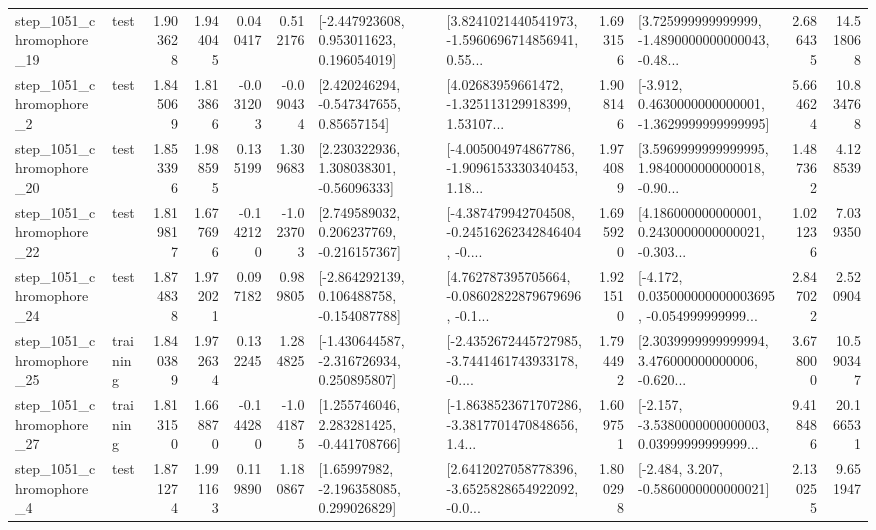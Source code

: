\begin{tabular}{llrrrrllrlrr}
 step\_1051\_chromophore\_19 &      test &      1.903628 &    1.944045 &      0.040417 &  0.512176 &    [-2.447923608, 0.953011623, 0.196054019] &  [3.8241021440541973, -1.5960696714856941, 0.55... &       1.693156 &  [3.725999999999999, -1.4890000000000043, -0.48... &            2.686435 &         14.518068 \\
  step\_1051\_chromophore\_2 &      test &      1.845069 &    1.813866 &     -0.031203 & -0.090434 &     [2.420246294, -0.547347655, 0.85657154] &  [4.02683959661472, -1.325113129918399, 1.53107... &       1.908146 &  [-3.912, 0.4630000000000001, -1.3629999999999995] &            5.664624 &         10.834768 \\
 step\_1051\_chromophore\_20 &      test &      1.853396 &    1.988595 &      0.135199 &  1.309683 &     [2.230322936, 1.308038301, -0.56096333] &  [-4.005004974867786, -1.9096153330340453, 1.18... &       1.974089 &  [3.5969999999999995, 1.9840000000000018, -0.90... &            1.487362 &          4.128539 \\
 step\_1051\_chromophore\_22 &      test &      1.819817 &    1.677696 &     -0.142120 & -1.023703 &    [2.749589032, 0.206237769, -0.216157367] &  [-4.387479942704508, -0.24516262342846404, -0.... &       1.695920 &  [4.186000000000001, 0.2430000000000021, -0.303... &            1.021236 &          7.039350 \\
 step\_1051\_chromophore\_24 &      test &      1.874838 &    1.972021 &      0.097182 &  0.989805 &   [-2.864292139, 0.106488758, -0.154087788] &  [4.762787395705664, -0.08602822879679696, -0.1... &       1.921510 &  [-4.172, 0.035000000000003695, -0.054999999999... &            2.847022 &          2.520904 \\
 step\_1051\_chromophore\_25 &  training &      1.840389 &    1.972634 &      0.132245 &  1.284825 &   [-1.430644587, -2.316726934, 0.250895807] &  [-2.4352672445727985, -3.7441461743933178, -0.... &       1.794492 &  [2.3039999999999994, 3.476000000000006, -0.620... &            3.678000 &         10.590347 \\
 step\_1051\_chromophore\_27 &  training &      1.813150 &    1.668870 &     -0.144280 & -1.041875 &    [1.255746046, 2.283281425, -0.441708766] &  [-1.8638523671707286, -3.3817701470848656, 1.4... &       1.609751 &  [-2.157, -3.5380000000000003, 0.03999999999999... &            9.418486 &         20.166531 \\
  step\_1051\_chromophore\_4 &      test &      1.871274 &    1.991163 &      0.119890 &  1.180867 &     [1.65997982, -2.196358085, 0.299026829] &  [2.6412027058778396, -3.6525828654922092, -0.0... &       1.800298 &               [-2.484, 3.207, -0.5860000000000021] &            2.130255 &          9.651947 \\

\end{tabular}
